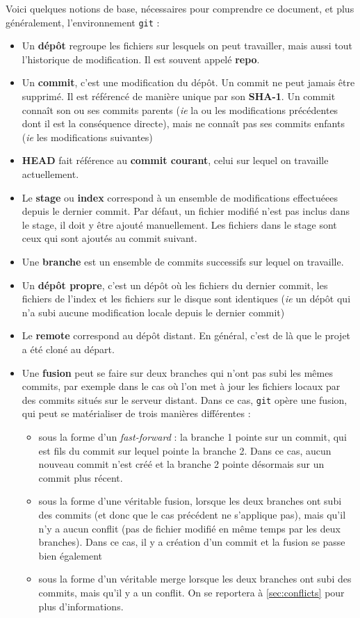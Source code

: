 \documentclass[french]{report}
\newcommand\itemb{\item[$\bullet$]}
\begin{document}
Voici quelques notions de base, nécessaires pour comprendre ce document, et plus généralement, l'environnement \texttt{git} :
\begin{itemize}
    \itemb Un \textbf{dépôt} regroupe les fichiers sur lesquels on peut travailler, mais aussi tout l'historique de modification. Il est souvent appelé \textbf{repo}.
    \itemb Un \textbf{commit}, c'est une modification du dépôt.
    Un commit ne peut jamais être supprimé.
    Il est référencé de manière unique par son \textbf{SHA-1}.
    Un commit connaît son ou ses commits parents (\textit{ie} la ou les modifications précédentes dont il est la conséquence directe), mais ne connaît pas ses commits enfants (\textit{ie} les modifications suivantes)
    \itemb \textbf{HEAD} fait référence au \textbf{commit courant}, celui sur lequel on travaille actuellement.
    \itemb Le \textbf{stage} ou \textbf{index} correspond à un ensemble de modifications effectuéees depuis le dernier commit.
    Par défaut, un fichier modifié n'est pas inclus dans le stage, il doit y être ajouté manuellement.
    Les fichiers dans le stage sont ceux qui sont ajoutés au commit suivant.
    \itemb Une \textbf{branche} est un ensemble de commits successifs sur lequel on travaille.
    \itemb Un \textbf{dépôt propre}, c'est un dépôt où les fichiers du dernier commit, les fichiers de l'index et les fichiers sur le disque sont identiques (\textit{ie} un dépôt qui n'a subi aucune modification locale depuis le dernier commit)
    \itemb Le \textbf{remote} correspond au dépôt distant. En général, c'est de là que le projet a été cloné au départ.
    \itemb Une \textbf{fusion} peut se faire sur deux branches qui n'ont pas subi les mêmes commits, par exemple dans le cas où l'on met à jour les fichiers locaux par des commits situés sur le serveur distant.
    Dans ce cas, \texttt{git} opère une fusion, qui peut se matérialiser de trois manières différentes :
    \begin{itemize}
        \item sous la forme d'un \textit{fast-forward} : la branche 1 pointe sur un commit, qui est fils du commit sur lequel pointe la branche 2.
        Dans ce cas, aucun nouveau commit n'est créé et la branche 2 pointe désormais sur un commit plus récent.
        \item sous la forme d'une véritable fusion, lorsque les deux branches ont subi des commits (et donc que le cas précédent ne s'applique pas), mais qu'il n'y a aucun conflit (pas de fichier modifié en même temps par les deux branches).
        Dans ce cas, il y a création d'un commit et la fusion se passe bien également
        \item sous la forme d'un véritable merge lorsque les deux branches ont subi des commits, mais qu'il y a un conflit. On se reportera à \ref{sec:conflicts} pour plus d'informations.
    \end{itemize}
\end{itemize}
\end{document}
